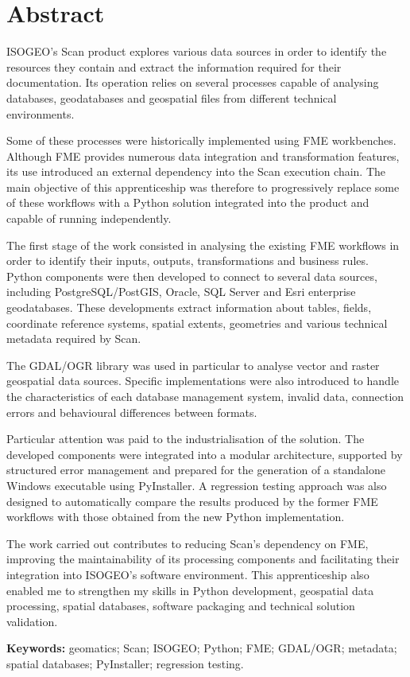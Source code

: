 
\chapter*{Abstract}

ISOGEO's Scan product explores various data sources in order to identify the
resources they contain and extract the information required for their
documentation. Its operation relies on several processes capable of analysing
databases, geodatabases and geospatial files from different technical
environments.

Some of these processes were historically implemented using FME workbenches.
Although FME provides numerous data integration and transformation features,
its use introduced an external dependency into the Scan execution chain. The
main objective of this apprenticeship was therefore to progressively replace
some of these workflows with a Python solution integrated into the product and
capable of running independently.

The first stage of the work consisted in analysing the existing FME workflows
in order to identify their inputs, outputs, transformations and business rules.
Python components were then developed to connect to several data sources,
including PostgreSQL/PostGIS, Oracle, SQL Server and Esri enterprise
geodatabases. These developments extract information about tables, fields,
coordinate reference systems, spatial extents, geometries and various technical
metadata required by Scan.

The GDAL/OGR library was used in particular to analyse vector and raster
geospatial data sources. Specific implementations were also introduced to
handle the characteristics of each database management system, invalid data,
connection errors and behavioural differences between formats.

Particular attention was paid to the industrialisation of the solution. The
developed components were integrated into a modular architecture, supported by
structured error management and prepared for the generation of a standalone
Windows executable using PyInstaller. A regression testing approach was also
designed to automatically compare the results produced by the former FME
workflows with those obtained from the new Python implementation.

The work carried out contributes to reducing Scan's dependency on FME,
improving the maintainability of its processing components and facilitating
their integration into ISOGEO's software environment. This apprenticeship also
enabled me to strengthen my skills in Python development, geospatial data
processing, spatial databases, software packaging and technical solution
validation.

\vspace{0.7cm}

\noindent
\textbf{Keywords:}
geomatics; Scan; ISOGEO; Python; FME; GDAL/OGR; metadata; spatial databases;
PyInstaller; regression testing.
